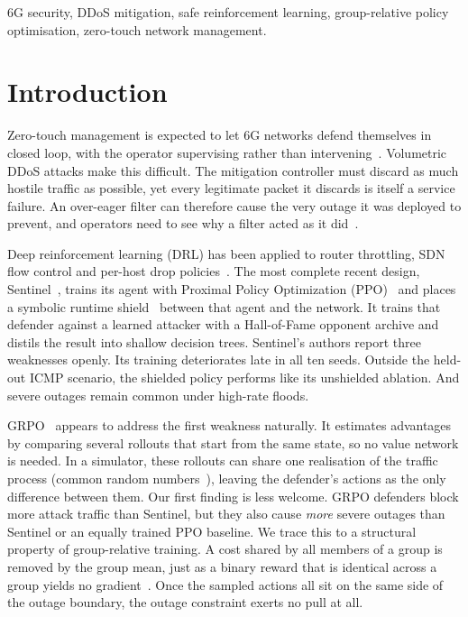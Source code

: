 \documentclass[conference]{IEEEtran}
\begin{document}
\begin{IEEEkeywords}
6G security, DDoS mitigation, safe reinforcement learning, group-relative policy optimisation, zero-touch network management.
\end{IEEEkeywords}

\section{Introduction}
Zero-touch management is expected to let 6G networks defend themselves in closed loop, with the operator supervising rather than intervening~\cite{benzaid2020zsm,liyanage2023oran}. Volumetric DDoS attacks make this difficult. The mitigation controller must discard as much hostile traffic as possible, yet every legitimate packet it discards is itself a service failure. An over-eager filter can therefore cause the very outage it was deployed to prevent, and operators need to see why a filter acted as it did~\cite{guo2020xai6g,senevirathna2025xaib5gsec}.

Deep reinforcement learning (DRL) has been applied to router throttling, SDN flow control and per-host drop policies~\cite{malialis2015distributed,liu2018drlddos,simpson2020perhost,akbari2020atmos}. The most complete recent design, Sentinel~\cite{alfatemi2026sentinel}, trains its agent with Proximal Policy Optimization (PPO)~\cite{schulman2017ppo} and places a symbolic runtime shield~\cite{alshiekh2018shielding} between that agent and the network. It trains that defender against a learned attacker with a Hall-of-Fame opponent archive and distils the result into shallow decision trees. Sentinel's authors report three weaknesses openly. Its training deteriorates late in all ten seeds. Outside the held-out ICMP scenario, the shielded policy performs like its unshielded ablation. And severe outages remain common under high-rate floods.

GRPO~\cite{shao2024deepseekmath} appears to address the first weakness naturally. It estimates advantages by comparing several rollouts that start from the same state, so no value network is needed. In a simulator, these rollouts can share one realisation of the traffic process (common random numbers~\cite{ng2000pegasus}), leaving the defender's actions as the only difference between them. Our first finding is less welcome. GRPO defenders block more attack traffic than Sentinel, but they also cause \emph{more} severe outages than Sentinel or an equally trained PPO baseline. We trace this to a structural property of group-relative training. A cost shared by all members of a group is removed by the group mean, just as a binary reward that is identical across a group yields no gradient~\cite{nie2026starvation,yu2025dapo}. Once the sampled actions all sit on the same side of the outage boundary, the outage constraint exerts no pull at all.
\end{document}
